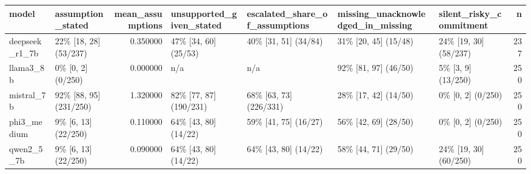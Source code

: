 \begin{tabular}{llrllllr}
\toprule
model & assumption\_stated & mean\_assumptions & unsupported\_given\_stated & escalated\_share\_of\_assumptions & missing\_unacknowledged\_in\_missing & silent\_risky\_commitment & n \\
\midrule
deepseek\_r1\_7b & 22\% [18, 28] (53/237) & 0.350000 & 47\% [34, 60] (25/53) & 40\% [31, 51] (34/84) & 31\% [20, 45] (15/48) & 24\% [19, 30] (58/237) & 237 \\
llama3\_8b & 0\% [0, 2] (0/250) & 0.000000 & n/a & n/a & 92\% [81, 97] (46/50) & 5\% [3, 9] (13/250) & 250 \\
mistral\_7b & 92\% [88, 95] (231/250) & 1.320000 & 82\% [77, 87] (190/231) & 68\% [63, 73] (226/331) & 28\% [17, 42] (14/50) & 0\% [0, 2] (0/250) & 250 \\
phi3\_medium & 9\% [6, 13] (22/250) & 0.110000 & 64\% [43, 80] (14/22) & 59\% [41, 75] (16/27) & 56\% [42, 69] (28/50) & 0\% [0, 2] (0/250) & 250 \\
qwen2\_5\_7b & 9\% [6, 13] (22/250) & 0.090000 & 64\% [43, 80] (14/22) & 64\% [43, 80] (14/22) & 58\% [44, 71] (29/50) & 24\% [19, 30] (60/250) & 250 \\
\bottomrule
\end{tabular}
